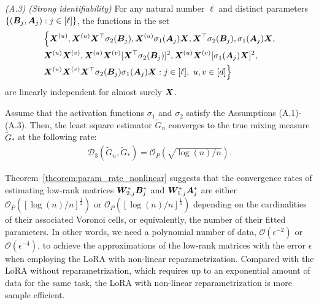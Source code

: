 \noindent
\emph{(A.3) (Strong identifiability)} For any natural number $\ell$ and distinct parameters $\{({\bm B}_{j},{\bm A}_{j}):j\in[\ell]\}$, the functions in the set
\begin{align*}
    &\Big\{{\bm X}^{(u)}, {\bm X}^{(u)}{\bm X}^{\top}\sigma_2({\bm B}_{j}),{\bm X}^{(u)}\sigma_1({\bm A}_{j}){\bm X}, {\bm X}^{\top}\sigma_2({\bm B}_{j}),\sigma_1({\bm A}_{j}){\bm X},\\
    &{\bm X}^{(u)}{\bm X}^{(v)}, {\bm X}^{(u)}{\bm X}^{(v)}[{\bm X}^{\top}\sigma_2({\bm B}_{j})]^2, {\bm X}^{(u)}{\bm X}^{(v)}[\sigma_1({\bm A}_{j}){\bm X}]^2,\\
    &{\bm X}^{(u)}{\bm X}^{(v)}{\bm X}^{\top}\sigma_2({\bm B}_{j})\sigma_1({\bm A}_{j}){\bm X}:j\in[\ell], \ u,v\in[d]\Big\}
\end{align*}
are linearly independent for almost surely ${\bm X}$.
\begin{theorem}
    \label{theorem:param_rate_nonlinear}
    Assume that the activation functions $\sigma_1$ and $\sigma_2$ satisfy the Assumptions (A.1)-(A.3). Then, the least square estimator $\widetilde{G}_n$ converges to the true mixing measure $\widetilde{G}_*$ at the following rate:
    \begin{align*}    \mathcal{D}_3(\widetilde{G}_n,\widetilde{G}_*)=\mathcal{O}_{P}(\sqrt{\log(n)/n}).
    \end{align*}
\end{theorem}
Theorem~\ref{theorem:param_rate_nonlinear} suggests that the convergence rates of estimating low-rank matrices $\bm{W}^*_{2,j}{\bm B}^*_j$ and $\bm{W}^*_{1,j}{\bm A}^*_j$ are either $\mathcal{O}_P([\log(n)/n]^{\frac{1}{2}})$ or $\mathcal{O}_P([\log(n)/n]^{\frac{1}{4}})$ depending on the cardinalities of their associated Voronoi cells, or equivalently, the number of their fitted parameters. In other words, we need a polynomial number of data, $\mathcal{O}(\epsilon^{-2})$ or $\mathcal{O}(\epsilon^{-4})$, to achieve the approximations of the low-rank matrices with the error $\epsilon$ when employing the LoRA with non-linear reparametrization. Compared with the LoRA without reparametrization, which requires up to an exponential amount of data for the same task, the LoRA with non-linear reparametrization is more sample efficient.